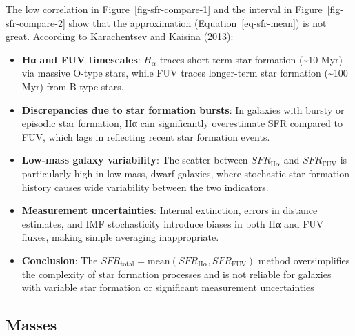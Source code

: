 \documentclass[
]{article}
\begin{document}
The low correlation in Figure~\ref{fig-sfr-compare-1} and the interval
in Figure~\ref{fig-sfr-compare-2} show that the approximation
(Equation~\ref{eq-sfr-mean}) is not great. According to Karachentsev and
Kaisina (2013):

\begin{itemize}
\item
  \textbf{Hα and FUV timescales}: \(H_\alpha\) traces short-term star
  formation (\textasciitilde10 Myr) via massive O-type stars, while FUV
  traces longer-term star formation (\textasciitilde100 Myr) from B-type
  stars.
\item
  \textbf{Discrepancies due to star formation bursts}: In galaxies with
  bursty or episodic star formation, Hα can significantly overestimate
  SFR compared to FUV, which lags in reflecting recent star formation
  events.
\item
  \textbf{Low-mass galaxy variability}: The scatter between
  \(SFR_{\text{H}\alpha}\) and \(SFR_{\text{FUV}}\) is particularly high
  in low-mass, dwarf galaxies, where stochastic star formation history
  causes wide variability between the two indicators.
\item
  \textbf{Measurement uncertainties}: Internal extinction, errors in
  distance estimates, and IMF stochasticity introduce biases in both Hα
  and FUV fluxes, making simple averaging inappropriate.
\item
  \textbf{Conclusion}: The
  \(SFR_{\text{total}} = \text{mean}(SFR_{\text{H}\alpha}, SFR_{\text{FUV}})\)
  method oversimplifies the complexity of star formation processes and
  is not reliable for galaxies with variable star formation or
  significant measurement uncertainties
\end{itemize}

\newpage{}

\subsection{Masses}\label{masses}
\end{document}

